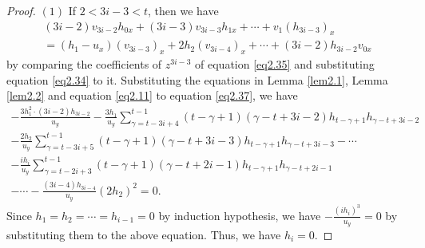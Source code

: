 \documentclass[12pt, twoside, leqno]{article}
\theoremstyle{definition}
\numberwithin{equation}{section}
\begin{document}
\begin{proof}
$(1)$ If $2<3i-3<t$, then we have
\begin{equation}\label{eq2.37}
\begin{split}
(3i-2)v_{3i-2}h_{0x}+(3i-3)v_{3i-3}h_{1x}+\cdots+v_{1}(h_{3i-3})_x\\=(h_{1}-u_{x})(v_{3i-3})_x+2h_{2}(v_{3i-4})_x+\cdots+(3i-2)h_{3i-2}v_{0x}
\end{split}
\end{equation}
by comparing the coefficients of $z^{3i-3}$ of equation \eqref{eq2.35} and substituting equation \eqref{eq2.34} to it. Substituting the equations in Lemma \ref{lem2.1}, Lemma \ref{lem2.2} and equation  \eqref{eq2.11} to equation \eqref{eq2.37}, we have
\begin{equation}\nonumber
\begin{split}
-\frac{3h_{1}^{2}\cdot(3i-2)h_{3i-2}}{u_{y}}-\frac{3h_{1}}{u_{y}}\sum_{\gamma=t-3i+4}^{t-1}(t-\gamma+1)(\gamma-t+3i-2)h_{t-\gamma+1}h_{\gamma-t+3i-2}\\-\frac{2h_{2}}{u_{y}}\sum_{\gamma=t-3i+5}^{t-1}(t-\gamma+1)(\gamma-t+3i-3)h_{t-\gamma+1}h_{\gamma-t+3i-3}-\cdots\\
	 -\frac{ih_{i}}{u_{y}}\sum_{\gamma=t-2i+3}^{t-1}(t-\gamma+1)(\gamma-t+2i-1)h_{t-\gamma+1}h_{\gamma-t+2i-1} \\-\cdots-\frac{(3i-4)h_{3i-4}}{u_{y}}(2h_{2})^{2}=0.
\end{split}
\end{equation}
Since $h_1=h_2=\cdots=h_{i-1}=0$ by induction hypothesis, we have $-\frac{(ih_{i})^{3}}{u_{y}}=0$ by substituting them to the above equation. Thus, we have $h_i=0$.


\end{proof}
\end{document}
